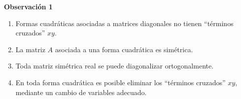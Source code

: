 {\begin{frame}
\vspace{-1mm}
\begin{alertblock}{\textbf{Observación 1}}
	\begin{enumerate}[$a$]\justifying 
		\item Formas cuadráticas asociadas a matrices diagonales no tienen ``términos cruzados'' $xy$.
		\item La matriz $A$ asociada a una forma cuadrática es simétrica.
		\item Toda matriz simétrica real se puede diagonalizar ortogonalmente.
		\item En toda forma cuadrática es posible eliminar los ``términos cruzados'' $xy$, 
		mediante un cambio de variables adecuado.
	\end{enumerate}
\end{alertblock}	

\end{frame}
}


\subsection{} 

